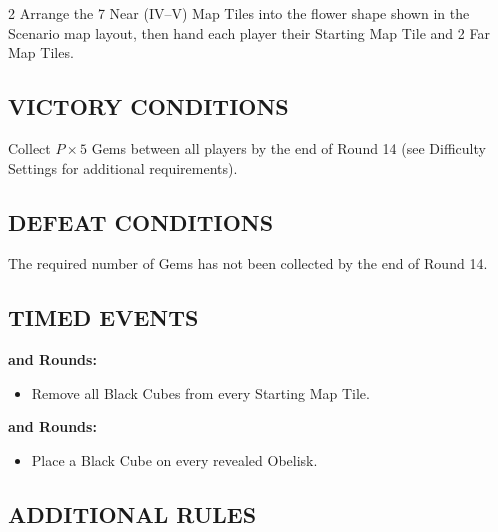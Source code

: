 \begin{multicols}{2}
Arrange the 7 Near (IV--V) Map Tiles into the flower shape shown in the Scenario map layout, then hand each player their Starting Map Tile and 2 Far Map Tiles.

\subsection*{\MakeUppercase{Victory Conditions}}

Collect $P \times 5$ Gems between all players by the end of Round 14 (see Difficulty Settings for additional requirements).

\subsection*{\MakeUppercase{Defeat Conditions}}

The required number of Gems has not been collected by the end of Round 14.

\subsection*{\MakeUppercase{Timed Events}}

\textbf{ and  Rounds:}
\begin{itemize}
  \item Remove all Black Cubes from every Starting Map Tile.
\end{itemize}
\textbf{ and  Rounds:}
\begin{itemize}
  \item Place a Black Cube on every revealed Obelisk.
\end{itemize}

\subsection*{\MakeUppercase{Additional Rules}}


\end{multicols}
